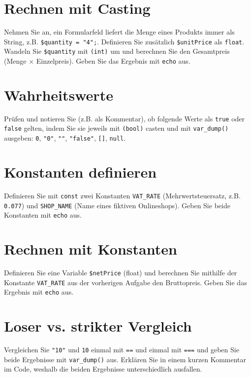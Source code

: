\documentclass[a4paper,12pt]{article}
\begin{document}
\section{Rechnen mit Casting}

Nehmen Sie an, ein Formularfeld liefert die Menge eines Produkts immer als String, z.B. \texttt{\$quantity = "4";}. Definieren Sie zusätzlich \texttt{\$unitPrice} als \texttt{float}. Wandeln Sie \texttt{\$quantity} mit \texttt{(int)} um und berechnen Sie den Gesamtpreis (Menge $\times$ Einzelpreis). Geben Sie das Ergebnis mit \texttt{echo} aus.

\section{Wahrheitswerte}

Prüfen und notieren Sie (z.B. als Kommentar), ob folgende Werte als \texttt{true} oder \texttt{false} gelten, indem Sie sie jeweils mit \texttt{(bool)} casten und mit \texttt{var\_dump()} ausgeben: \texttt{0}, \texttt{"0"}, \texttt{""}, \texttt{"false"}, \texttt{[]}, \texttt{null}.

\section{Konstanten definieren}

Definieren Sie mit \texttt{const} zwei Konstanten \texttt{VAT\_RATE} (Mehrwertsteuersatz, z.B. \texttt{0.077}) und \texttt{SHOP\_NAME} (Name eines fiktiven Onlineshops). Geben Sie beide Konstanten mit \texttt{echo} aus.

\section{Rechnen mit Konstanten}

Definieren Sie eine Variable \texttt{\$netPrice} (float) und berechnen Sie mithilfe der Konstante \texttt{VAT\_RATE} aus der vorherigen Aufgabe den Bruttopreis. Geben Sie das Ergebnis mit \texttt{echo} aus.

\section{Loser vs. strikter Vergleich}

Vergleichen Sie \texttt{"10"} und \texttt{10} einmal mit \texttt{==} und einmal mit \texttt{===} und geben Sie beide Ergebnisse mit \texttt{var\_dump()} aus. Erklären Sie in einem kurzen Kommentar im Code, weshalb die beiden Ergebnisse unterschiedlich ausfallen.
\end{document}
